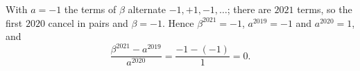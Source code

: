 With $a=-1$ the terms of $\beta$ alternate $-1,+1,-1,\dots$; there are $2021$ terms, so the first $2020$ cancel in pairs and $\beta=-1$. Hence $\beta^{2021}=-1$, $a^{2019}=-1$ and $a^{2020}=1$, and
\[\dfrac{\beta^{2021}-a^{2019}}{a^{2020}}=\dfrac{-1-(-1)}{1}=\boxed{0}.\]
